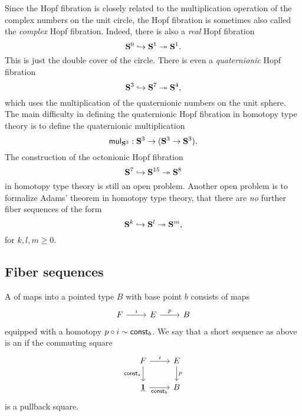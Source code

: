 Since the Hopf fibration is closely related to the multiplication operation of the complex numbers on the unit circle, the Hopf fibration is sometimes also called the \emph{complex} Hopf fibration. Indeed, there is also a \emph{real} Hopf fibration
\begin{equation*}
  \mathbf{S}^{0}\hookrightarrow\mathbf{S}^{1}\twoheadrightarrow\mathbf{S}^{1}.
\end{equation*}
This is just the double cover of the circle. There is even a \emph{quaternionic} Hopf fibration
\begin{equation*}
  \mathbf{S}^{3}\hookrightarrow\mathbf{S}^{7}\twoheadrightarrow\mathbf{S}^{4},
\end{equation*}
which uses the multiplication of the quaternionic numbers on the unit sphere. The main difficulty in defining the quaternionic Hopf fibration in homotopy type theory is to define the quaternionic multiplication
\begin{equation*}
  \mathsf{mul}_{\mathbf{S}^{3}} : \mathbf{S}^{3}\to(\mathbf{S}^{3}\to\mathbf{S}^{3}).
\end{equation*}
The construction of the octonionic Hopf fibration
\begin{equation*}
  \mathbf{S}^{7}\hookrightarrow\mathbf{S}^{15}\twoheadrightarrow\mathbf{S}^{8}
\end{equation*}
in homotopy type theory is still an open problem. Another open problem is to formalize Adams' theorem \cite{Adams58} in homotopy type theory, that there are \emph{no} further fiber sequences of the form
\begin{equation*}
  \mathbf{S}^{k}\hookrightarrow\mathbf{S}^{l}\twoheadrightarrow\mathbf{S}^{m},
\end{equation*}
for $k,l,m\geq 0$.

\subsection{Fiber sequences}

\begin{defn}
  A  of maps into a pointed type $B$ with base point $b$ consists of maps
  \begin{equation*}
    \begin{tikzcd}
      F \arrow[r,"i"] & E \arrow[r,"p"] & B
    \end{tikzcd}
  \end{equation*}
  equipped with a homotopy $p\circ i\sim \mathsf{const}_b$. We say that a short sequence as above is an  if the commuting square
  \begin{equation*}
    \begin{tikzcd}
      F \arrow[r,"i"] \arrow[d,swap,"\const_\star"] & E \arrow[d,"p"] \\
      \unit \arrow[r,swap,"\const_b"] & B
    \end{tikzcd}
  \end{equation*}
  is a pullback square.
\end{defn}

